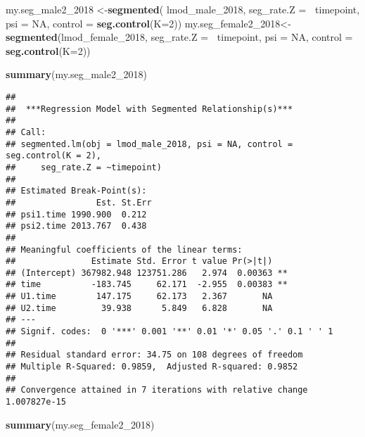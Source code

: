 \documentclass[]{article}
\newenvironment{Shaded}{\begin{snugshade}}{\end{snugshade}}
\newcommand{\KeywordTok}[1]{\textcolor[rgb]{0.13,0.29,0.53}{\textbf{#1}}}
\newcommand{\DataTypeTok}[1]{\textcolor[rgb]{0.13,0.29,0.53}{#1}}
\newcommand{\DecValTok}[1]{\textcolor[rgb]{0.00,0.00,0.81}{#1}}
\newcommand{\StringTok}[1]{\textcolor[rgb]{0.31,0.60,0.02}{#1}}
\newcommand{\OtherTok}[1]{\textcolor[rgb]{0.56,0.35,0.01}{#1}}
\newcommand{\OperatorTok}[1]{\textcolor[rgb]{0.81,0.36,0.00}{\textbf{#1}}}
\newcommand{\NormalTok}[1]{#1}
\begin{document}
\begin{Shaded}
\begin{Highlighting}[]
\NormalTok{my.seg_male2_}\DecValTok{2018}\NormalTok{ <-}\KeywordTok{segmented}\NormalTok{( lmod_male_}\DecValTok{2018}\NormalTok{, }\DataTypeTok{seg_rate.Z =} \OperatorTok{~}\NormalTok{timepoint, }\DataTypeTok{psi =} \OtherTok{NA}\NormalTok{, }\DataTypeTok{control =} \KeywordTok{seg.control}\NormalTok{(}\DataTypeTok{K=}\DecValTok{2}\NormalTok{))}
\NormalTok{my.seg_female2_}\DecValTok{2018}\NormalTok{<-}\StringTok{ }\KeywordTok{segmented}\NormalTok{(lmod_female_}\DecValTok{2018}\NormalTok{, }\DataTypeTok{seg_rate.Z =} \OperatorTok{~}\NormalTok{timepoint, }\DataTypeTok{psi =} \OtherTok{NA}\NormalTok{, }\DataTypeTok{control =} \KeywordTok{seg.control}\NormalTok{(}\DataTypeTok{K=}\DecValTok{2}\NormalTok{))}

\KeywordTok{summary}\NormalTok{(my.seg_male2_}\DecValTok{2018}\NormalTok{)}
\end{Highlighting}
\end{Shaded}

\begin{verbatim}
## 
##  ***Regression Model with Segmented Relationship(s)***
## 
## Call: 
## segmented.lm(obj = lmod_male_2018, psi = NA, control = seg.control(K = 2), 
##     seg_rate.Z = ~timepoint)
## 
## Estimated Break-Point(s):
##                Est. St.Err
## psi1.time 1990.900  0.212
## psi2.time 2013.767  0.438
## 
## Meaningful coefficients of the linear terms:
##               Estimate Std. Error t value Pr(>|t|)   
## (Intercept) 367982.948 123751.286   2.974  0.00363 **
## time          -183.745     62.171  -2.955  0.00383 **
## U1.time        147.175     62.173   2.367       NA   
## U2.time         39.938      5.849   6.828       NA   
## ---
## Signif. codes:  0 '***' 0.001 '**' 0.01 '*' 0.05 '.' 0.1 ' ' 1
## 
## Residual standard error: 34.75 on 108 degrees of freedom
## Multiple R-Squared: 0.9859,  Adjusted R-squared: 0.9852 
## 
## Convergence attained in 7 iterations with relative change 1.007827e-15
\end{verbatim}

\begin{Shaded}
\begin{Highlighting}[]
\KeywordTok{summary}\NormalTok{(my.seg_female2_}\DecValTok{2018}\NormalTok{)}
\end{Highlighting}
\end{Shaded}
\end{document}
